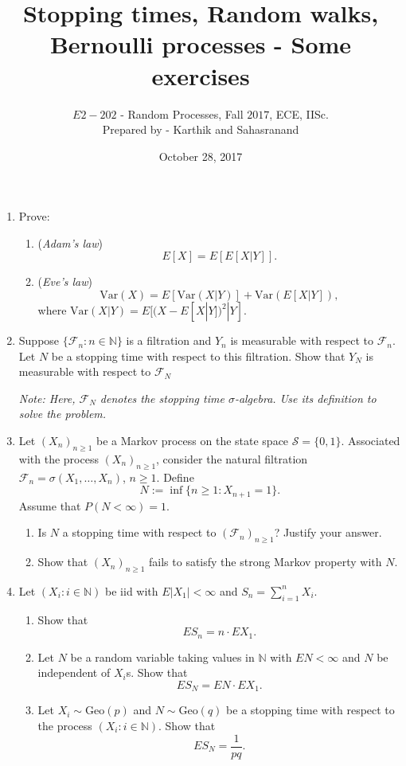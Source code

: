 \documentclass[10pt]{article}
\title {\sc Stopping times, Random walks, Bernoulli processes - Some exercises}
\author{$E2-202$ - Random Processes, Fall $2017$, ECE, IISc.\\Prepared by - Karthik and Sahasranand}
\date{October 28, 2017}
\begin{document}
\maketitle 
\begin{enumerate}
	\item Prove:
	\begin{enumerate}
		\item (\emph{Adam's law})
		\[
		E[X] = E\left[E[X|Y]\right].
		\]
		\item (\emph{Eve's law})
		\[
		\text{Var}(X)  = E\left[\text{Var}(X|Y)\right] + \text{Var}\left(E[X|Y]\right),
		\]
		where $\text{Var}(X|Y)=E[(X-E[X|Y])^{2}|Y]$.
	\end{enumerate}

\item Suppose $\{\mathcal{F}_n: n \in \mathbb{N}\}$ is a filtration and $Y_n$ is measurable with respect to $\mathcal{F}_n$. Let $N$ be a stopping time with respect to this filtration. Show that $Y_N$ is measurable with respect to $\mathcal{F}_N$ 

\emph{Note: Here, $\mathcal{F}_{N}$ denotes the stopping time $\sigma$-algebra. Use its definition to solve the problem.}

\item Let $(X_n)_{n\geq 1}$ be a Markov process on the state space $\mathcal{S}=\{0,1\}$. Associated with the process $(X_n)_{n\geq 1}$, consider the natural filtration $\mathcal{F}_{n}=\sigma(X_{1},\ldots,X_{n})$, $n\geq 1$. Define
\begin{equation*}
N:=\inf\{n\geq 1:X_{n+1}=1\}.
\end{equation*}
Assume that $P(N<\infty)=1$.
\begin{enumerate}
	\item Is $N$ a stopping time with respect to $(\mathcal{F}_{n})_{n\geq 1}$? Justify your answer.
	\item Show that $(X_{n})_{n\geq 1}$ fails to satisfy the strong Markov property with $N$.
\end{enumerate}

\item Let $(X_i: i \in \mathbb{N})$ be iid with $E|X_1| < \infty$ and $S_n = \sum_{i=1}^n X_i$.
\begin{enumerate}
	\item Show that 
	\[
	ES_n = n\cdot EX_1.
	\]
	\item Let $N$ be a random variable taking values in $\mathbb{N}$ with $EN < \infty$ and $N$ be independent of $X_i$s.  Show that
	\[
	ES_N = EN \cdot EX_1.
	\]
	\item Let $X_i \sim \text{Geo}(p)$ and $N \sim \text{Geo}(q)$ be a stopping time with respect to the process $(X_i: i \in \mathbb{N})$. Show that
	\[
	ES_N = \frac{1}{pq}.
	\]
\end{enumerate}


\end{enumerate}
\end{document}
